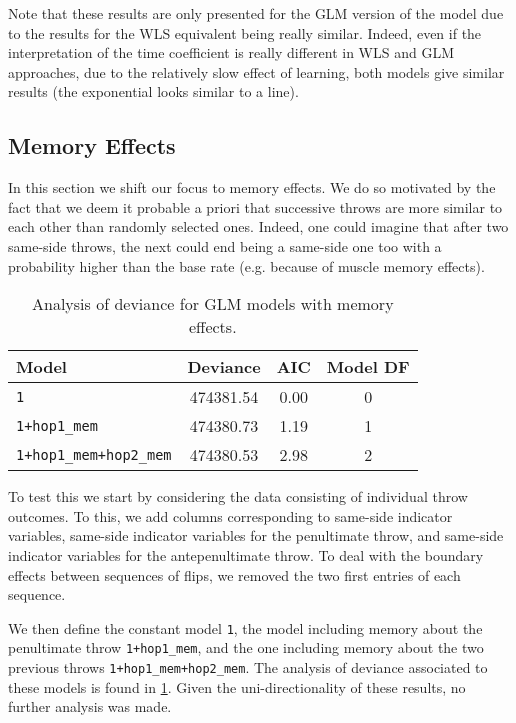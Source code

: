 \documentclass[a4paper, 12pt,oneside]{article}
\begin{document}
			Note that these results are only presented for the GLM version of the model due to the results for the WLS equivalent being really similar. Indeed, even if the interpretation of the time coefficient is really different in WLS and GLM approaches, due to the relatively slow effect of learning, both models give similar results (the exponential looks similar to a line).    
		\subsection{Memory Effects}
			In this section we shift our focus to memory effects. We do so motivated by the fact that we deem it probable a priori that successive throws are more similar to each other than randomly selected ones. Indeed, one could imagine that after two same-side throws, the next could end being a same-side one too with a probability higher than the base rate (e.g. because of muscle memory effects). 
			\begin{table}[htb]
				\centering
				\caption{Analysis of deviance for GLM models with memory effects.}
				\label{tab:memory-model-comparison}
				\begin{tabular}{lccc}
				\toprule
				Model & Deviance & AIC & Model DF \\
				\midrule
				\texttt{1} & 474381.54 & 0.00 & 0 \\
				\texttt{1+hop1\_mem} & 474380.73 & 1.19 & 1 \\
				\texttt{1+hop1\_mem+hop2\_mem} & 474380.53 & 2.98 & 2 \\
				\bottomrule
				\end{tabular}
			\end{table}

			To test this we start by considering the data consisting of individual throw outcomes. To this, we add columns corresponding to same-side indicator variables, same-side indicator variables for the penultimate throw, and same-side indicator variables for the antepenultimate throw.
			To deal with the boundary effects between sequences of flips, we removed the two first entries of each sequence. 
			
			We then define the constant model \texttt{1}, the model including memory about the penultimate throw \texttt{1+hop1\_mem}, and the one including memory about the two previous throws \texttt{1+hop1\_mem+hop2\_mem}. The analysis of deviance associated to these models is found in \ref{tab:memory-model-comparison}. Given the uni-directionality of these results, no further analysis was made.  
\end{document}
